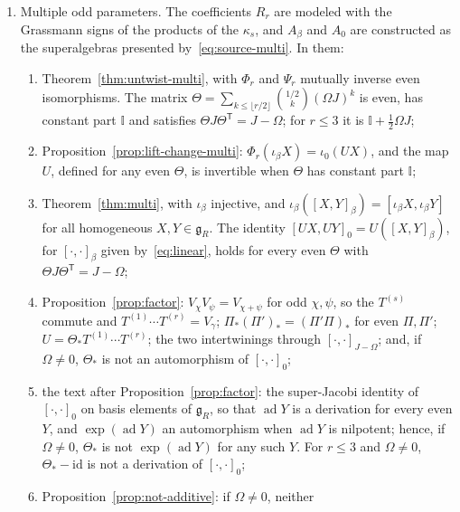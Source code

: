 \documentclass[11pt]{article}
\numberwithin{equation}{section}
\theoremstyle{definition}
\theoremstyle{remark}
\newcommand{\osp}{\mathfrak{osp}}
\newcommand{\ad}{\operatorname{ad}}
\begin{document}
\begin{enumerate}
is injective, and has every homogeneous element of $\osp(M,\mathcal B)$ in its image, so that it is
bijective onto $\osp(M,\mathcal B)$. In the stated order, the Gram matrix of $-\mathcal B$ is the matrix $G$ of~\cite{FSS00}. Mathlib has no
Lie superalgebras, so $M$, $\mathcal B$ and $\osp(M,\mathcal B)$ are defined in the
development's own terms.
\item Multiple odd parameters. The coefficients $R_r$ are modeled with the Grassmann signs
of the products of the $\kappa_s$, and $A_\beta$ and $A_0$ are constructed as the
superalgebras presented by~\eqref{eq:source-multi}. In them:
\begin{enumerate}
\item Theorem~\ref{thm:untwist-multi}, with $\Phi_r$ and $\Psi_r$ mutually inverse even
isomorphisms. The matrix $\Theta=\sum_{k\leq\lfloor r/2\rfloor}\binom{1/2}{k}(\Omega J)^k$ is even,
has constant part $\mathbb I$ and satisfies $\Theta J\Theta^{\mathsf T}=J-\Omega$; for $r\leq3$ it
is $\mathbb I+\tfrac12\Omega J$;
\item Proposition~\ref{prop:lift-change-multi}: $\Phi_r(\iota_\beta X)=\iota_0(UX)$, and the map
$U$, defined for any even $\Theta$, is invertible when $\Theta$ has constant part $\mathbb I$;
\item Theorem~\ref{thm:multi}, with $\iota_\beta$ injective, and
$\iota_\beta([X,Y]_\beta)=[\iota_\beta X,\iota_\beta Y]$ for all homogeneous $X,Y\in\mathfrak g_R$. The identity
$[UX,UY]_0=U([X,Y]_\beta)$, for $[\cdot,\cdot]_\beta$ given by~\eqref{eq:linear}, holds for every
even $\Theta$ with $\Theta J\Theta^{\mathsf T}=J-\Omega$;
\item Proposition~\ref{prop:factor}: $V_\chi V_\psi=V_{\chi+\psi}$ for odd $\chi,\psi$, so
the $T^{(s)}$ commute and $T^{(1)}\cdots T^{(r)}=V_\gamma$; $\Pi_*(\Pi')_*=(\Pi'\Pi)_*$ for even
$\Pi,\Pi'$; $U=\Theta_*T^{(1)}\cdots T^{(r)}$; the two intertwinings through
$[\cdot,\cdot]_{J-\Omega}$; and, if $\Omega\neq0$, $\Theta_*$ is not an automorphism of
$[\cdot,\cdot]_0$;
\item the text after Proposition~\ref{prop:factor}: the super-Jacobi identity of
$[\cdot,\cdot]_0$ on basis elements of $\mathfrak g_R$, so that $\ad Y$ is a derivation for
every even $Y$, and $\exp(\ad Y)$ an automorphism when $\ad Y$ is nilpotent; hence, if
$\Omega\neq0$, $\Theta_*$ is not $\exp(\ad Y)$ for any such $Y$. For $r\leq3$ and
$\Omega\neq0$, $\Theta_*-\mathrm{id}$ is not a derivation of $[\cdot,\cdot]_0$;
\item Proposition~\ref{prop:not-additive}: if $\Omega\neq0$, neither

\end{enumerate}
\end{enumerate}
\end{document}

